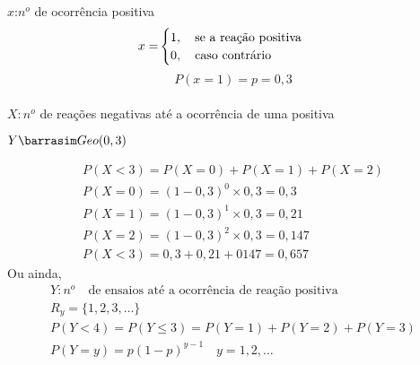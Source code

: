 \documentclass[11pt,a4paper]{book}
\begin{document}
\begin{description}
      $x$:$n^o$ de ocorrência positiva 
      \begin{align*}
        x=&\begin{cases}
          1, \text{\quad se a reação positiva}\\
          0, \text{\quad caso contrário}
        \end{cases}
      \end{align*}
      $$P(x=1)=p=0,3$$\\
      $X: n^o$ de reações negativas até a ocorrência de uma positiva\\
      \begin{center}$Y \barrasim Geo(0,3)$\end{center}
      \begin{align*}
        P(X<3)=P(X=0)+P(X=1)+P(X=2)\\
        P(X=0)=(1-0,3)^0 \times 0,3 = 0,3\\
        P(X=1)=(1-0,3)^1 \times 0,3 = 0,21\\
        P(X=2)=(1-0,3)^2 \times 0,3 = 0,147\\
        P(X<3)=0,3+0,21+0147=0,657
      \end{align*}
      Ou ainda,
      \begin{align*}
        Y: n^o \quad \text{de ensaios até a ocorrência de reação positiva}\\
        R_y = \{ 1,2,3,\ldots \}\\
        P( Y<4 ) = P (Y \leq 3) = P(Y=1)+ P(Y=2)+P(Y=3)\\
        P(Y=y)= p(1-p)^{y-1} \quad y=1,2,\dots
      \end{align*}
    \end{description}
\end{document}
